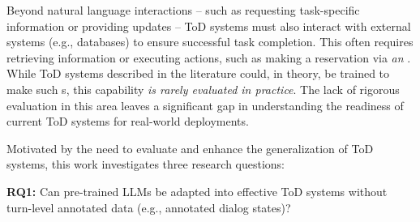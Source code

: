 Beyond natural language interactions -- such as requesting task-specific information or providing updates -- ToD systems must also interact with external systems (e.g., databases) to ensure successful task completion.
This often requires retrieving information or executing actions, such as making a reservation via \emph{an \apicall}. 
While ToD systems described in the literature could, in theory, be trained to make such {\apicall}s, this capability \emph{is rarely evaluated in practice}. The lack of rigorous evaluation in this area leaves a significant gap in understanding the readiness of current ToD systems for real-world deployments.







Motivated by the need to evaluate and enhance the {\ood} generalization of ToD systems, this work investigates three research questions:

\noindent
\textbf{RQ1:} Can pre-trained LLMs be adapted into effective ToD systems without turn-level annotated data (e.g., annotated dialog states)?

